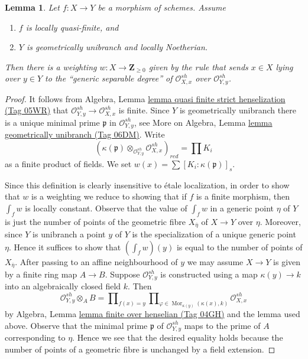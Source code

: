 \documentclass{amsart}
\theoremstyle{plain}
\newtheorem{lemma}[subsection]{Lemma}
\theoremstyle{definition}
\theoremstyle{remark}
\numberwithin{equation}{subsection}
\def\Mor{\mathop{\mathrm{Mor}}\nolimits}
\begin{document}
\begin{lemma}
\label{lemma-weighting-quasi-finite-Noetherian}
Let $f : X \to Y$ be a morphism of schemes. Assume
\begin{enumerate}
\item $f$ is locally quasi-finite, and
\item $Y$ is geometrically unibranch and locally Noetherian.
\end{enumerate}
Then there is a weighting $w : X \to \mathbf{Z}_{\geq 0}$ given by
the rule that sends $x \in X$ lying over $y \in Y$ to the
``generic separable degree''
of $\mathcal{O}_{X, x}^{sh}$ over $\mathcal{O}_{Y, y}^{sh}$.
\end{lemma}

\begin{proof}
It follows from Algebra, Lemma
\href{https://stacks.math.columbia.edu/tag/05WR}{lemma quasi finite strict henselization (Tag 05WR)}
that $\mathcal{O}_{Y, y}^{sh} \to \mathcal{O}_{X, x}^{sh}$
is finite. Since $Y$ is geometrically unibranch
there is a unique minimal prime $\mathfrak p$ in
$\mathcal{O}_{Y, y}^{sh}$, see
More on Algebra, Lemma \href{https://stacks.math.columbia.edu/tag/06DM}{lemma geometrically unibranch (Tag 06DM)}.
Write
$$
(\kappa(\mathfrak p) \otimes_{\mathcal{O}_{Y, y}^{sh}}
\mathcal{O}_{X, x}^{sh})_{red} =
\prod K_i
$$
as a finite product of fields.
We set $w(x) = \sum [K_i : \kappa(\mathfrak p)]_s$.

\medskip\noindent
Since this definition is clearly insensitive to \'etale localization,
in order to show that $w$ is a weighting we reduce to showing that if
$f$ is a finite morphism, then $\int_f w$ is locally constant.
Observe that the value of $\int_f w$ in a generic point $\eta$
of $Y$ is just the number of points of the geometric fibre
$X_{\overline{\eta}}$ of $X \to Y$ over $\eta$. Moreover, since
$Y$ is unibranch a point $y$ of $Y$ is the specialization of a unique
generic point $\eta$. Hence it suffices to show that $(\int_f w)(y)$
is equal to the number of points of $X_{\overline{\eta}}$.
After passing to an affine neighbourhood of $y$ we may assume
$X \to Y$ is given by a finite ring map $A \to B$. Suppose
$\mathcal{O}_{Y, y}^{sh}$ is constructed using a map
$\kappa(y) \to k$ into an algebraically closed field $k$.
Then
$$
\mathcal{O}_{Y, y}^{sh} \otimes_A B =
\prod\nolimits_{f(x) = y}
\prod\nolimits_{\varphi \in \Mor_{\kappa(y)}(\kappa(x), k)}
\mathcal{O}_{X, x}^{sh}
$$
by Algebra, Lemma \href{https://stacks.math.columbia.edu/tag/04GH}{lemma finite over henselian (Tag 04GH)}
and the lemma used above.
Observe that the minimal prime $\mathfrak p$ of $\mathcal{O}_{Y, y}^{sh}$
maps to the prime of $A$ corresponding to $\eta$. Hence we see that
the desired equality holds because the number of points of a geometric
fibre is unchanged by a field extension.
\end{proof}
\end{document}
